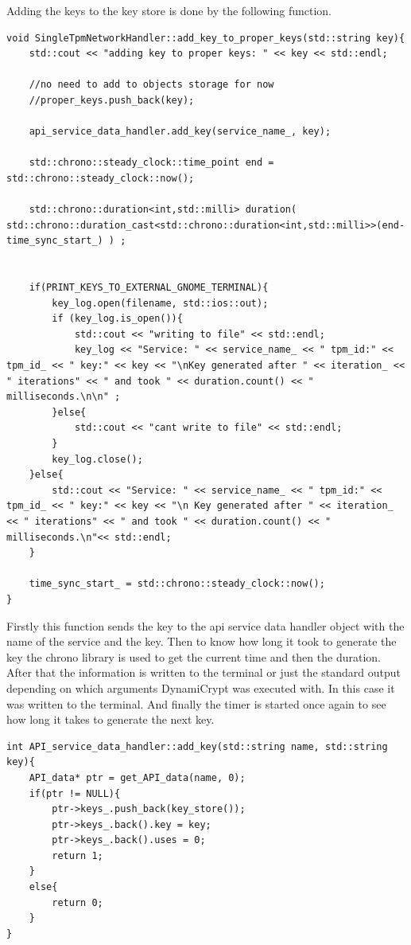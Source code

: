 Adding the keys to the key store is done by the following function.
\begin{lstlisting}
void SingleTpmNetworkHandler::add_key_to_proper_keys(std::string key){
	std::cout << "adding key to proper keys: " << key << std::endl;
	
	//no need to add to objects storage for now
	//proper_keys.push_back(key);
	
	api_service_data_handler.add_key(service_name_, key);
	
	std::chrono::steady_clock::time_point end = std::chrono::steady_clock::now();
	
	std::chrono::duration<int,std::milli> duration( std::chrono::duration_cast<std::chrono::duration<int,std::milli>>(end-time_sync_start_) ) ;
	
	
	if(PRINT_KEYS_TO_EXTERNAL_GNOME_TERMINAL){
		key_log.open(filename, std::ios::out);
		if (key_log.is_open()){
			std::cout << "writing to file" << std::endl;
			key_log << "Service: " << service_name_ << " tpm_id:" << tpm_id_ << " key:" << key << "\nKey generated after " << iteration_ << " iterations" << " and took " << duration.count() << " milliseconds.\n\n" ;
		}else{
			std::cout << "cant write to file" << std::endl;
		}
		key_log.close();
	}else{
		std::cout << "Service: " << service_name_ << " tpm_id:" << tpm_id_ << " key:" << key << "\n Key generated after " << iteration_ << " iterations" << " and took " << duration.count() << " milliseconds.\n"<< std::endl;
	}
	
	time_sync_start_ = std::chrono::steady_clock::now();
}     
\end{lstlisting}
Firstly this function sends the key to the api service data handler object with the name of the service and the key. Then to know how long it took to generate the key the chrono library is used to get the current time and then the duration. After that the information is written to the terminal or just the standard output depending on which arguments DynamiCrypt was executed with. In this case it was written to the terminal. And finally the timer is started once again to see how long it takes to generate the next key.

\begin{lstlisting}
int API_service_data_handler::add_key(std::string name, std::string key){
	API_data* ptr = get_API_data(name, 0);
	if(ptr != NULL){
		ptr->keys_.push_back(key_store());
		ptr->keys_.back().key = key;
		ptr->keys_.back().uses = 0;
		return 1;
	}
	else{
		return 0;
	}
}
\end{lstlisting}

